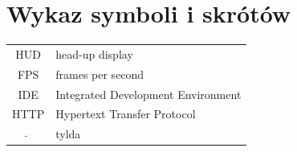\documentclass[a4paper,11pt,twoside]{report}
\theoremstyle{definition}
\begin{document}
\chapter*{Wykaz symboli i skrótów}

\begin{tabular}{cl}
HUD & head-up display \\
FPS & frames per second \\
IDE & Integrated Development Environment \\
HTTP & Hypertext Transfer Protocol \\
$\widetilde{}$ & tylda
\end{tabular}
\thispagestyle{empty}


\listoffigures
\thispagestyle{empty}


\renewcommand{\listtablename}{Spis tabel}
\listoftables
\thispagestyle{empty}






\end{document}
